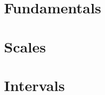 \documentclass{book}
\begin{document}
    \chapter{Fundamentals}
    
    \chapter{Scales}
    
    \chapter{Intervals}
    
\end{document}
